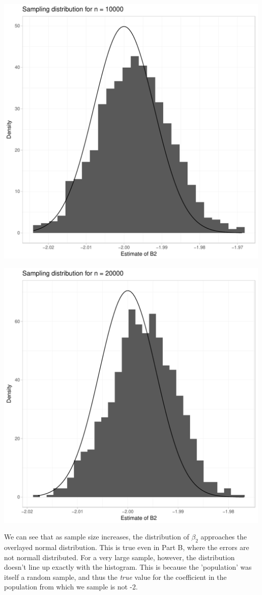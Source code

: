 \documentclass[english, 11pt]{article}\usepackage[]{graphicx}\usepackage[]{color}
\makeatletter
\def\maxwidth{ %
  \ifdim\Gin@nat@width>\linewidth
    \linewidth
  \else
    \Gin@nat@width
  \fi
}
\newenvironment{knitrout}{}{} %
\makeatother
\begin{document}
\begin{knitrout}
\includegraphics[width=\maxwidth]{figure/Part_B-4} 

\includegraphics[width=\maxwidth]{figure/Part_B-5} 

\end{knitrout}

We can see that as sample size increases, the distribution of $\beta_{2}$ approaches the overlayed normal distribution. This is true even in Part B, where the errors are not normall distributed. For a very large sample, however, the distribution doesn't line up exactly with the histogram. This is because the 'population' was itself a random sample, and thus the \textit{true} value for the coefficient in the population from which we sample is not -2. 
\end{document}
